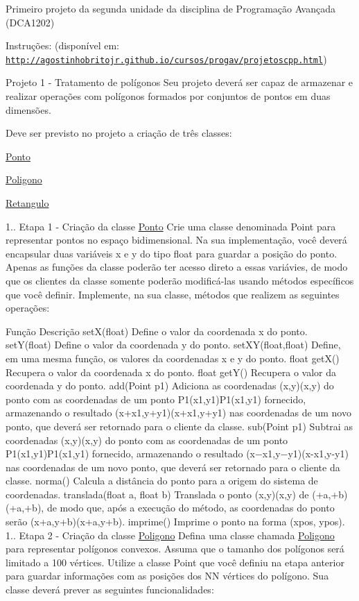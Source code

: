 Primeiro projeto da segunda unidade da disciplina de Programação Avançada (D\+C\+A1202)

Instruções\+: (disponível em\+: \href{http://agostinhobritojr.github.io/cursos/progav/projetoscpp.html}{\tt http\+://agostinhobritojr.\+github.\+io/cursos/progav/projetoscpp.\+html})


\begin{DoxyEnumerate}
\item Projeto 1 -\/ Tratamento de polígonos Seu projeto deverá ser capaz de armazenar e realizar operações com polígonos formados por conjuntos de pontos em duas dimensões.
\end{DoxyEnumerate}

Deve ser previsto no projeto a criação de três classes\+:

\hyperlink{class_ponto}{Ponto}

\hyperlink{class_poligono}{Poligono}

\hyperlink{class_retangulo}{Retangulo}

1.. Etapa 1 -\/ Criação da classe \hyperlink{class_ponto}{Ponto} Crie uma classe denominada Point para representar pontos no espaço bidimensional. Na sua implementação, você deverá encapsular duas variáveis x e y do tipo float para guardar a posição do ponto. Apenas as funções da classe poderão ter acesso direto a essas variávies, de modo que os clientes da classe somente poderão modificá-\/las usando métodos específicos que você definir. Implemente, na sua classe, métodos que realizem as seguintes operações\+:

Função Descrição set\+X(float) Define o valor da coordenada x do ponto. set\+Y(float) Define o valor da coordenada y do ponto. set\+X\+Y(float,float) Define, em uma mesma função, os valores da coordenadas x e y do ponto. float get\+X() Recupera o valor da coordenada x do ponto. float get\+Y() Recupera o valor da coordenada y do ponto. add(\+Point p1) Adiciona as coordenadas (x,y)(x,y) do ponto com as coordenadas de um ponto P1(x1,y1)P1(x1,y1) fornecido, armazenando o resultado (x+x1,y+y1)(x+x1,y+y1) nas coordenadas de um novo ponto, que deverá ser retornado para o cliente da classe. sub(\+Point p1) Subtrai as coordenadas (x,y)(x,y) do ponto com as coordenadas de um ponto P1(x1,y1)P1(x1,y1) fornecido, armazenando o resultado (x−x1,y−y1)(x-\/x1,y-\/y1) nas coordenadas de um novo ponto, que deverá ser retornado para o cliente da classe. norma() Calcula a distância do ponto para a origem do sistema de coordenadas. translada(float a, float b) Translada o ponto (x,y)(x,y) de (+a,+b)(+a,+b), de modo que, após a execução do método, as coordenadas do ponto serão (x+a,y+b)(x+a,y+b). imprime() Imprime o ponto na forma (xpos, ypos). 1.. Etapa 2 -\/ Criação da classe \hyperlink{class_poligono}{Poligono} Defina uma classe chamada \hyperlink{class_poligono}{Poligono} para representar polígonos convexos. Assuma que o tamanho dos polígonos será limitado a 100 vértices. Utilize a classe Point que você definiu na etapa anterior para guardar informações com as posições dos NN vértices do polígono. Sua classe deverá prever as seguintes funcionalidades\+:

